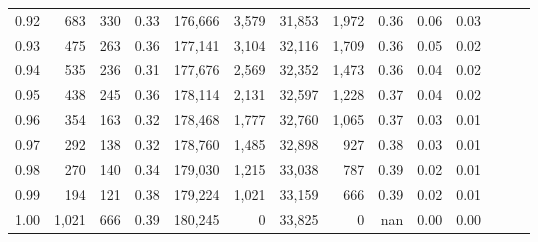 \begin{tabular}{rrrrrrrrrrrrrr}
0.92 &    683 &  330 &  0.33 &  176,666 &    3,579 &  31,853 &   1,972 &  0.36 &  0.06 &      0.03 \\
0.93 &    475 &  263 &  0.36 &  177,141 &    3,104 &  32,116 &   1,709 &  0.36 &  0.05 &      0.02 \\
0.94 &    535 &  236 &  0.31 &  177,676 &    2,569 &  32,352 &   1,473 &  0.36 &  0.04 &      0.02 \\
0.95 &    438 &  245 &  0.36 &  178,114 &    2,131 &  32,597 &   1,228 &  0.37 &  0.04 &      0.02 \\
0.96 &    354 &  163 &  0.32 &  178,468 &    1,777 &  32,760 &   1,065 &  0.37 &  0.03 &      0.01 \\
0.97 &    292 &  138 &  0.32 &  178,760 &    1,485 &  32,898 &     927 &  0.38 &  0.03 &      0.01 \\
0.98 &    270 &  140 &  0.34 &  179,030 &    1,215 &  33,038 &     787 &  0.39 &  0.02 &      0.01 \\
0.99 &    194 &  121 &  0.38 &  179,224 &    1,021 &  33,159 &     666 &  0.39 &  0.02 &      0.01 \\
1.00 &  1,021 &  666 &  0.39 &  180,245 &        0 &  33,825 &       0 &   nan &  0.00 &      0.00 \\
\bottomrule
\end{tabular}
